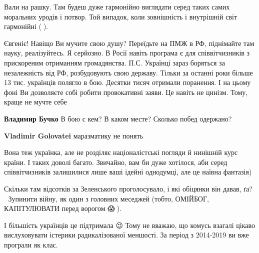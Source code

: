 \begin{itemize}
Вали на рашку. Там будеш дуже гармонійно виглядати серед таких самих моральних уродів і потвор. Той випадок, коли зовнішність і внутрішній світ гармонійні (🤮).

 

Євгеніє! Навіщо Ви мучите свою душу? Переїдьте на ПМЖ в РФ, піднімайте там науку, реалізуйтесь. Я серйозно. В Росії навіть програма є для співвітчизників з прискореним отриманням громадянства. П.С. Українці зараз боряться за незалежність від РФ, розбудовують свою державу. Тільки за останні роки більше 13 тис. українців полягло в бою. Десятки тисяч отримали поранення. І на цьому фоні Ви дозволяєте собі робити провокативні заяви. Це навіть не цинізм. Тому, краще не мучте себе

\begin{itemize}
 
\textbf{Владимир Бучко}
В бою с кем? В каком месте? Сколько побед одержано?

 
\textbf{Vladimir Golovatei} маразматику не понять

 
Вона теж українка, але не розділяє націоналістські погляди й нинішній курс
країни. І таких доволі багато. Звичайно, вам би дуже хотілося, аби серед
співвітчизників залишилися лише ваші ідейні однодумці, але це наївна фантазія)

Скільки там відсотків за Зеленського проголосувало, і які обіцянки він давав,
ґа? 🌚 Зупинити війну, як один з головних меседжей (тобто, ОМІЙБОГ,
КАПІТУЛЮВАТИ перед ворогом 😱🤣). 

І більшість українців це підтримала 😉 Тому не вважаю, що комусь взагалі цікаво
вислуховувати істерики радикалізованої меншості. За період з 2014-2019 ви вже
програли як клас.


\end{itemize}
\end{itemize}
